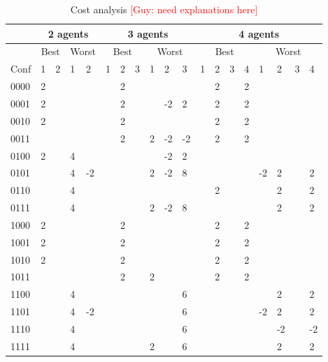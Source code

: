 \documentclass[letterpaper]{article} %
\newcommand{\guy}[1]{{\textcolor{red}{[Guy: #1]}}}
\begin{document}
{\begin{table}
\tiny
\begin{tabular}{|l||l|l||l|l||l|l|l||l|l|l||l|l|l|l||l|l|l|l|}
\hline
& \multicolumn{4}{c||}{2 agents}& \multicolumn{6}{c||}{3 agents}& \multicolumn{8}{c|}{4 agents} \\ \hline
	&	\multicolumn{2}{c|}{Best}	&			\multicolumn{2}{c||}{Worst}		&			\multicolumn{3}{c||}{Best}	&					\multicolumn{3}{c||}{Worst}		&					\multicolumn{4}{c||}{Best}			&					\multicolumn{4}{c|}{Worst}	 \\ \hline						
Conf	&	1	&	2	&	1	&	2	&		1	&	2	&	3	&	1	&	2	&	3	&		1	&	2	&	3	&	4	&	1	&	2	&	3	&	4	\\ \hline
0000	&	2	&		&		&		&			&	2	&		&		&		&		&			&	2	&		&	2	&		&		&		&		\\ \hline
0001	&	2	&		&		&		&			&	2	&		&		&	-2	&	2	&			&	2	&		&	2	&		&		&		&		\\ \hline
0010	&	2	&		&		&		&			&	2	&		&		&		&		&			&	2	&		&	2	&		&		&		&		\\ \hline
0011	&		&		&		&		&			&	2	&		&	2	&	-2	&	-2	&			&	2	&		&	2	&		&		&		&		\\ \hline
0100	&	2	&		&	4	&		&			&		&		&		&	-2	&	2	&			&		&		&		&	 	&		&		&		\\ \hline
0101	&		&		&	4	&	-2	&			&		&		&	2	&	-2	&	8	&			&		&		&		&	-2	&	2	&		&	2	\\ \hline
0110	&		&		&	4	&		&			&		&		&		&		&		&			&	2	&		&		&		&	2	&		&	2	\\ \hline
0111	&		&		&	4	&		&			&		&		&	2	&	-2	&	8	&			&		&		&		&		&	2	&		&	2	\\ \hline
1000	&	2	&		&		&		&			&	2	&		&		&		&		&			&	2	&		&	2	&		&		&		&		\\ \hline
1001	&	2	&		&		&		&			&	2	&		&		&		&		&			&	2	&		&	2	&		&		&		&		\\ \hline
1010	&	2	&		&		&		&			&	2	&		&		&		&		&			&	2	&		&	2	&		&		&		&		\\ \hline
1011	&		&		&		&		&			&	2	&		&	2	&		&		&			&	2	&		&	2	&		&		&		&		\\ \hline
1100	&		&		&	4	&		&			&		&		&		&		&	6	&			&		&		&		&		&	2	&		&	2	\\ \hline
1101	&		&		&	4	&	-2	&			&		&		&		&		&	6	&			&		&		&		&	-2	&	2	&		&	2	\\ \hline
1110	&		&		&	4	&		&			&		&		&		&		&	6	&			&		&		&		&		&	-2	&		&	-2	\\ \hline
1111	&		&		&	4	&		&			&		&		&	2	&		&	6	&			&		&		&		&		&	2	&		&	2	\\ \hline
\end{tabular}
\caption{Cost analysis \guy{need explanations here}}
\label{tbl:costs}
\end{table}
}
\end{document}
